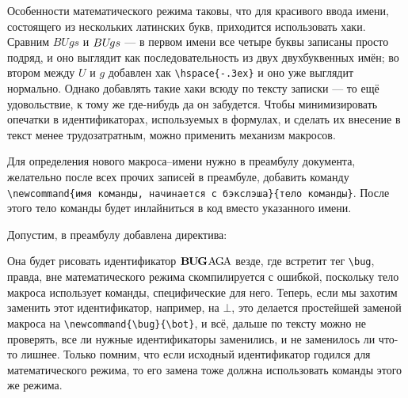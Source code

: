 \documentclass[14pt, russian]{scrartcl}
\begin{document}
Особенности математического режима таковы, что для красивого ввода имени, состоящего из нескольких латинских букв, приходится использовать хаки. Сравним $BUgs$ и $BU\hspace{-.3ex}gs$ --- в первом имени все четыре буквы записаны просто подряд, и оно выглядит как последовательность из двух двухбуквенных имён; во втором между $U$ и $g$ добавлен хак \texttt{\textbackslash hspace\{-.3ex\}} и оно уже выглядит нормально. Однако добавлять такие хаки всюду по тексту записки --- то ещё удовольствие, к тому же где-нибудь да он забудется. Чтобы минимизировать опечатки в идентификаторах, используемых в формулах, и сделать их внесение в текст менее трудозатратным, можно применить механизм макросов.

Для определения нового макроса--имени нужно в преамбулу документа, желательно после всех прочих записей в преамбуле, добавить команду \texttt{\textbackslash newcommand\{имя команды, начинается с бэкслэша\}\{тело команды\}}. После этого тело команды будет инлайниться в код вместо указанного имени. 

\begin{Example}
Допустим, в преамбулу добавлена директива:

\small
{}

\vspace{-1.5ex}

\normalsize
\justify Она будет рисовать идентификатор $\mathbf{B\hspace{-0.2ex}U\hspace{-0.2ex}G}\hspace{0.1ex}\mathrm{A\hspace{-0.2ex}G\hspace{-0.2ex}A}$ везде, где встретит тег \texttt{\textbackslash bug}, правда, вне математического режима скомпилируется с ошибкой, поскольку тело макроса использует команды, специфические для него. Теперь, если мы захотим заменить этот идентификатор, например, на $\bot$, это делается простейшей заменой макроса на \texttt{\textbackslash newcommand\{\textbackslash bug\}\{\textbackslash bot\}}, и всё, дальше по тексту можно не проверять, все ли нужные идентификаторы заменились, и не заменилось ли что-то лишнее. Только помним, что если исходный идентификатор годился для математического режима, то его замена тоже должна использовать команды этого же режима.
\end{Example}
\end{document}
